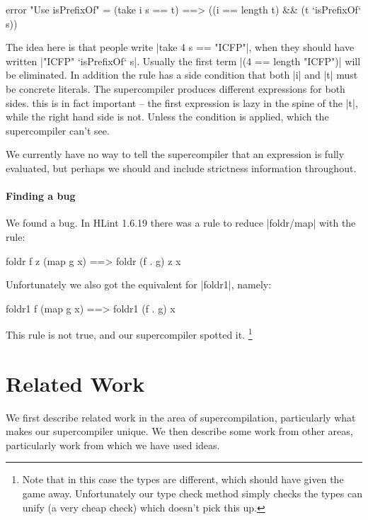 \documentclass[draft]{sigplanconf}
\begin{document}
\begin{code}
error "Use isPrefixOf" = (take i s == t) ==> ((i == length t) && (t `isPrefixOf` s))
\end{code}

The idea here is that people write |take 4 s == "ICFP"|, when they should have written |"ICFP" `isPrefixOf` s|. Usually the first term |(4 == length "ICFP")| will be eliminated. In addition the rule has a side condition that both |i| and |t| must be concrete literals. The supercompiler produces different expressions for both sides. this is in fact important -- the first expression is lazy in the spine of the |t|, while the right hand side is not. Unless the condition is applied, which the supercompiler can't see.

We currently have no way to tell the supercompiler that an expression is fully evaluated, but perhaps we should and include strictness information throughout.

\paragraph{Finding a bug}

We found a bug. In HLint 1.6.19 there was a rule to reduce |foldr/map| with the rule:

\begin{code}
foldr f z (map g x) ==> foldr (f . g) z x
\end{code}

Unfortunately we also got the equivalent for |foldr1|, namely:

\begin{code}
foldr1 f (map g x) ==> foldr1 (f . g) x
\end{code}

This rule is not true, and our supercompiler spotted it. \footnote{Note that in this case the types are different, which should have given the game away. Unfortunately our type check method simply checks the types can unify (a very cheap check) which doesn't pick this up.}


\section{Related Work}

We first describe related work in the area of supercompilation, particularly what makes our supercompiler unique. We then describe some work from other areas, particularly work from which we have used ideas.
\end{document}

